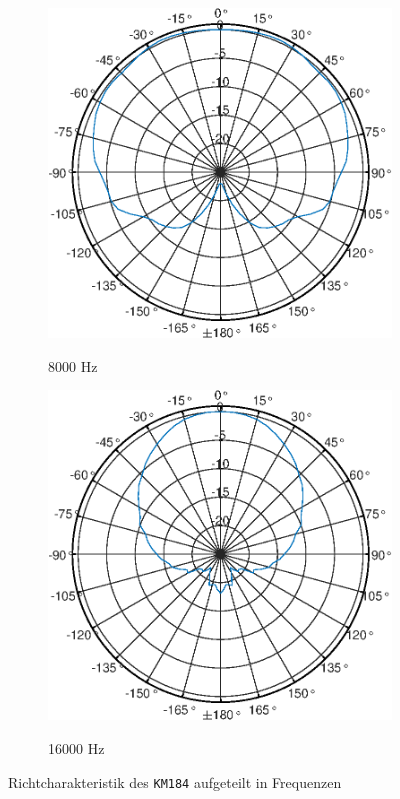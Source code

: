 \begin{figure}[bth]
\begin{subfigure}{.25\textwidth}
        \label{fig:Polar_4000}
    \end{subfigure}%
    \begin{subfigure}{.25\textwidth}
        \centering
        \caption{8000 Hz}
        \includegraphics[width=\linewidth]{Figures/KM184_8000Hz}
        \label{fig:Polar_8000}
    \end{subfigure}%
    \begin{subfigure}{.25\textwidth}
        \centering
        \caption{16000 Hz}
        \includegraphics[width=\linewidth]{Figures/KM184_16000Hz}
        \label{fig:Polar_16000}
    \end{subfigure}
    \caption{Richtcharakteristik des \texttt{KM184} aufgeteilt in Frequenzen}
    \label{fig:Polar_sep}
\end{figure}


